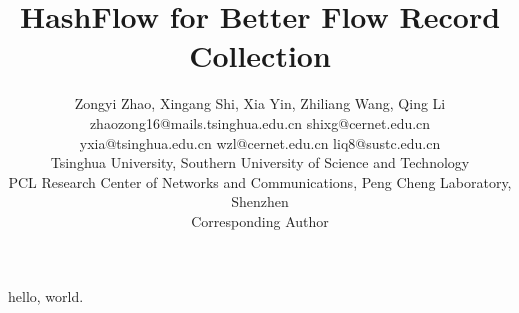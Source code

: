 \documentclass[10pt, conference, letterpaper]{IEEEtran}
\begin{document}
\title{HashFlow  for Better Flow Record Collection}
\author{Zongyi Zhao, Xingang Shi, Xia Yin, Zhiliang Wang, Qing Li\\ zhaozong16@mails.tsinghua.edu.cn shixg@cernet.edu.cn \\
yxia@tsinghua.edu.cn wzl@cernet.edu.cn liq8@sustc.edu.cn\\ 
	Tsinghua University, Southern University of Science and Technology\\ PCL Research Center of Networks and Communications, Peng Cheng Laboratory, Shenzhen\\ Corresponding Author}
\maketitle
hello, world.
\end{document}
